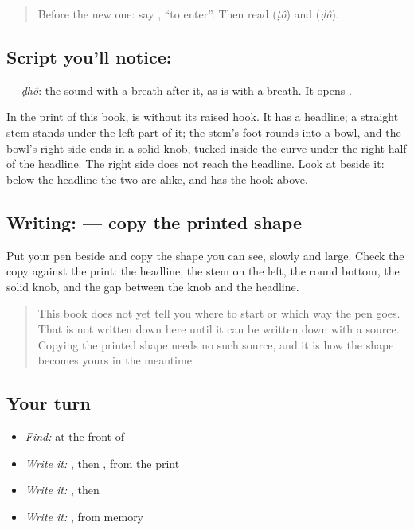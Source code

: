 \label{lesson:BN-W274-letter-ddha}



\begin{quote}
Before the new one: say \textbf{}, \textquotedblleft{}to enter\textquotedblright{}. Then read \textbf{} (\emph{ṭô}) and \textbf{} (\emph{ḍô}).
\end{quote}

\subsection*{Script you'll notice: }
\textbf{} — \emph{ḍhô}: the \textbf{} sound with a breath after it, as \textbf{} is \textbf{} with a breath. It opens \textbf{}.

In the print of this book, \textbf{} is \textbf{} without its raised hook. It has a headline; a straight stem stands under the left part of it; the stem's foot rounds into a bowl, and the bowl's right side ends in a solid knob, tucked inside the curve under the right half of the headline. The right side does not reach the headline. Look at \textbf{} beside it: below the headline the two are alike, and \textbf{} has the hook above.

\subsection*{Writing:  — copy the printed shape}
Put your pen beside \textbf{} and copy the shape you can see, slowly and large. Check the copy against the print: the headline, the stem on the left, the round bottom, the solid knob, and the gap between the knob and the headline.

\begin{quote}
This book does not yet tell you where to start  or which way the pen goes. That is not written down here until it can be written down with a source. Copying the printed shape needs no such source, and it is how the shape becomes yours in the meantime.
\end{quote}

\subsection*{Your turn}
\begin{itemize}
\raggedright
  \item \emph{Find:}  at the front of \textbf{}
  \item \emph{Write it:} , then , from the print
  \item \emph{Write it:} \textbf{}, then \textbf{}
  \item \emph{Write it:} \textbf{}, from memory
\end{itemize}

